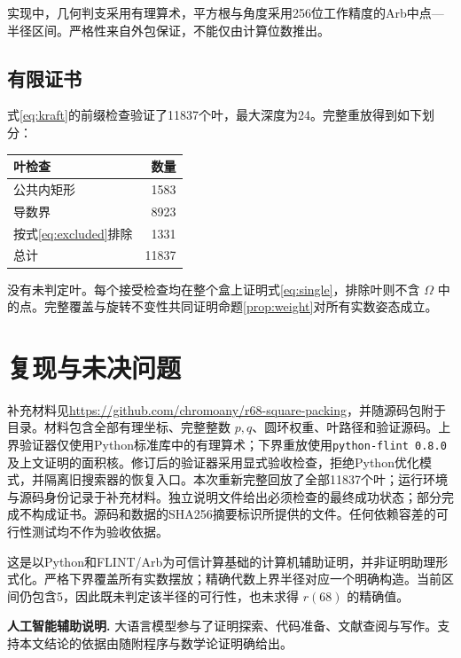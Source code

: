 \documentclass[11pt]{article}
\begin{document}
实现中，几何判支采用有理算术，平方根与角度采用256位工作精度的Arb中点—半径区间\cite{johansson}。严格性来自外包保证，不能仅由计算位数推出。

\subsection{有限证书}
式\eqref{eq:kraft}的前缀检查验证了11837个叶，最大深度为24。完整重放得到如下划分：
\begin{center}
\begin{tabular}{lr}
\toprule
叶检查 & 数量\\
\midrule
公共内矩形 & 1583\\
导数界 & 8923\\
按式\eqref{eq:excluded}排除 & 1331\\
\midrule
总计 & 11837\\
\bottomrule
\end{tabular}
\end{center}
没有未判定叶。每个接受检查均在整个盒上证明式\eqref{eq:single}，排除叶则不含 $\Omega$ 中的点。完整覆盖与旋转不变性共同证明命题\ref{prop:weight}对所有实数姿态成立。

\section{复现与未决问题}
补充材料见\url{https://github.com/chromoany/r68-square-packing}，并随源码包附于目录。材料包含全部有理坐标、完整整数 $p,q$、圆环权重、叶路径和验证源码。上界验证器仅使用Python标准库中的有理算术；下界重放使用\texttt{python-flint 0.8.0}及上文证明的面积核。修订后的验证器采用显式验收检查，拒绝Python优化模式，并隔离旧搜索器的恢复入口。本次重新完整回放了全部11837个叶；运行环境与源码身份记录于补充材料。独立说明文件给出必须检查的最终成功状态；部分完成不构成证书。源码和数据的SHA256摘要标识所提供的文件。任何依赖容差的可行性测试均不作为验收依据。

这是以Python和FLINT/Arb为可信计算基础的计算机辅助证明，并非证明助理形式化。严格下界覆盖所有实数摆放；精确代数上界半径对应一个明确构造。当前区间仍包含5，因此既未判定该半径的可行性，也未求得 $r(68)$ 的精确值。

\medskip
\noindent\textbf{人工智能辅助说明.} 大语言模型参与了证明探索、代码准备、文献查阅与写作。支持本文结论的依据由随附程序与数学论证明确给出。

\begingroup
\raggedright

\endgroup
\end{document}
